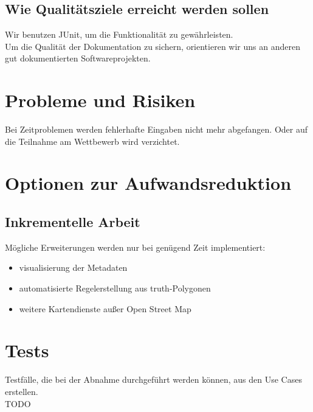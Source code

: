 \subsection{Wie Qualitätsziele erreicht werden sollen}
Wir benutzen JUnit, um die Funktionalität zu gewährleisten.\\
Um die Qualität der Dokumentation zu sichern, orientieren wir uns an anderen gut dokumentierten Softwareprojekten.
\section{Probleme und Risiken}
Bei Zeitproblemen werden fehlerhafte Eingaben nicht mehr abgefangen. Oder auf die Teilnahme am Wettbewerb wird verzichtet.
\section{Optionen zur Aufwandsreduktion}
\subsection{Inkrementelle Arbeit}
Mögliche Erweiterungen werden nur bei genügend Zeit implementiert:
\begin{itemize}
 \item visualisierung der Metadaten
 \item automatisierte Regelerstellung aus truth-Polygonen
 \item weitere Kartendienste außer Open Street Map
\end{itemize}

\section{Tests}
Testfälle, die bei der Abnahme durchgeführt werden können, aus den Use Cases erstellen.\\
TODO